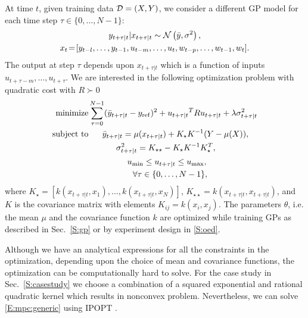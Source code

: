 At time \(t\), given training data \(\mathcal{D} = (X,Y) \), we consider a different GP model for each time step \(\tau \in \{0,\dots,N-1\}\):
\begin{gather}
y_{t+\tau|t} | x_{t+\tau|t} \sim \operatorname*{\mathcal{N}}\left(\bar{y}, \sigma^2\right), \\
x_{t}\!=\![y_{t-l}, \dots, y_{t-1}, u_{t-m}, \dots, u_t, w_{t-p}, \dots, w_{t-1}, w_t]. \nonumber
\end{gather}
The output at step \(\tau\) depends upon \(x_{t+\tau|t}\)  which is a function of inputs \(u_{t+\tau-m}, \dots, u_{t+\tau}\).
We are interested in the following optimization problem with quadratic cost with \(R \succ 0\)
\begin{align}
\label{E:mpc:generic}
\minimize & \sum_{\tau=0}^{N-1} (\bar{y}_{t+\tau|t}-y_{\mathrm{ref}})^2 + {u_{t+\tau|t}}^T R {u_{t+\tau|t}}+ \lambda \sigma^2_{t+\tau|t} \nonumber \\
\st & \ \ \ \ \ \bar{y}_{t+\tau|t} = \mu(x_{t+\tau|t}) + K_\star K^{-1} (Y - \mu(X)), \nonumber\\
& \ \ \ \ \ \ \ \ \ \ \sigma^2_{t+\tau|t} = K_{\star \star} - K_\star K^{-1} K_\star^T, \\
& \ \ \ \ \ \ \ \ \ \ \ \ \ \ u_{\mathrm{min}}  \leq u_{t+\tau|t} \leq u_{\mathrm{max}}, \nonumber\\
& \ \ \ \ \ \ \ \ \ \ \ \ \ \ \ \ \forall \tau \in \{0,\dots,N-1\}, \nonumber
\end{align}
where \(K_\star = [k(x_{t+\tau|t}, x_1), \dots, k(x_{t+\tau|t}, x_N)]\), \(K_{\star \star} = k(x_{t+\tau|t}, x_{t+\tau|t})\), and $K$ is the covariance matrix with elements \(K_{ij} = k(x_i, x_j)\). The parameters \(\theta\), i.e. the mean \(\mu\) and the covariance function \(k\) are optimized while training GPs as described in Sec.~\ref{S:gp} or by experiment design in \ref{S:oed}.

Although we have an analytical expressions for all the constraints in the optimization, depending upon the choice of mean and covariance functions, the optimization can be computationally hard to solve. For the case study in Sec.~\ref{S:casestudy} we choose a combination of a squared exponential and rational quadratic kernel which results in nonconvex problem. Nevertheless, we can solve \eqref{E:mpc:generic} using IPOPT \cite{Waechter2009b}.